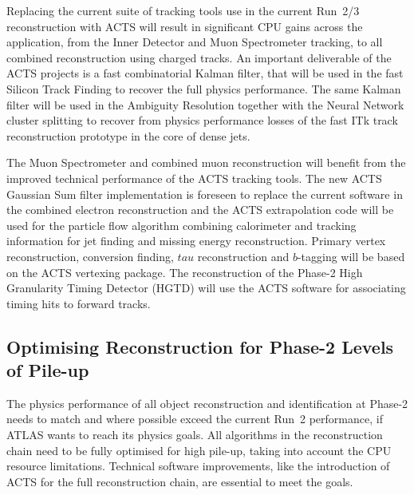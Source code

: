 Replacing the current suite of tracking tools use in the current Run~2/3 reconstruction with ACTS will result in significant CPU gains across the application, from the Inner Detector and Muon Spectrometer tracking, to all combined reconstruction using charged tracks. An important deliverable of the ACTS projects is a fast combinatorial Kalman filter, that will be used in the fast Silicon Track Finding to recover the full physics performance. The same Kalman filter will be used in the Ambiguity Resolution together with the Neural Network cluster splitting to recover from physics performance losses of the fast ITk track reconstruction prototype in the core of dense jets.

The Muon Spectrometer and combined muon reconstruction will benefit from the improved technical performance of the ACTS tracking tools. The new ACTS Gaussian Sum filter implementation is foreseen to replace the current software in the combined electron reconstruction and the ACTS extrapolation code will be used for the particle flow algorithm combining calorimeter and tracking information for jet finding and missing energy reconstruction. Primary vertex reconstruction, conversion finding, $tau$ reconstruction and $b$-tagging will be based on the ACTS vertexing package. The reconstruction of the Phase-2 High Granularity Timing Detector (HGTD) will use the ACTS software for associating timing hits to forward tracks.


\subsection{Optimising Reconstruction for Phase-2 Levels of Pile-up}

The physics performance of all object reconstruction and identification at Phase-2 needs to match and where possible exceed the current Run~2 performance, if ATLAS wants to reach its physics goals. All algorithms in the reconstruction chain need to be fully optimised for high pile-up, taking into account the CPU resource limitations. Technical software improvements, like the introduction of ACTS for the full reconstruction chain, are essential to meet the goals.

